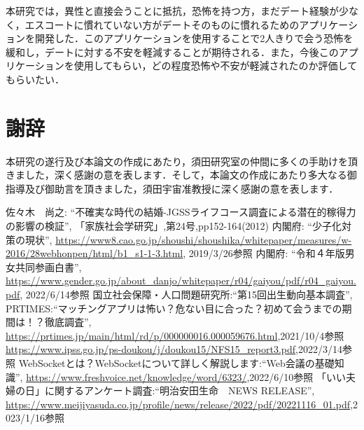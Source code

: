 \documentclass[12pt,a4j,titlepage]{ltjsarticle}
\begin{document}
本研究では，異性と直接会うことに抵抗，恐怖を持つ方，まだデート経験が少なく，エスコートに慣れていない方がデートそのものに慣れるためのアプリケーションを開発した．このアプリケーションを使用することで2人きりで会う恐怖を緩和し，デートに対する不安を軽減することが期待される．また，今後このアプリケーションを使用してもらい，どの程度恐怖や不安が軽減されたのか評価してもらいたい．

\clearpage



\section{謝辞}
本研究の遂行及び本論文の作成にあたり，須田研究室の仲間に多くの手助けを頂きました，深く感謝の意を表します．そして，本論文の作成にあたり多大なる御指導及び御助言を頂きました，須田宇宙准教授に深く感謝の意を表します．

\clearpage

\begin{thebibliography}{99}
 佐々木　尚之: ``不確実な時代の結婚-JGSSライフコース調査による潜在的稼得力の影響の検証'', 「家族社会学研究」,第24号,pp152-164(2012)
 内閣府: ``少子化対策の現状'', \url{https://www8.cao.go.jp/shoushi/shoushika/whitepaper/measures/w-2016/28webhonpen/html/b1_s1-1-3.html}, 2019/3/26参照
 内閣府: ``令和４年版男女共同参画白書'', \url{https://www.gender.go.jp/about_danjo/whitepaper/r04/gaiyou/pdf/r04_gaiyou.pdf}, 2022/6/14参照
国立社会保障・人口問題研究所:``第15回出生動向基本調査'',
PRTIMES:``マッチングアプリは怖い？危ない目に合った？初めて会うまでの期間は！？徹底調査'',
\url{https://prtimes.jp/main/html/rd/p/000000016.000059676.html},2021/10/4参照
\url{https://www.ipss.go.jp/ps-doukou/j/doukou15/NFS15_report3.pdf},2022/3/14参照
WebSocketとは？WebSocketについて詳しく解説します:``Web会議の基礎知識'',
\url{https://www.freshvoice.net/knowledge/word/6323/},2022/6/10参照
「いい夫婦の日」に関するアンケート調査:``明治安田生命　NEWS RELEASE'',
\url{https://www.meijiyasuda.co.jp/profile/news/release/2022/pdf/20221116_01.pdf},2023/1/16参照
\end{thebibliography}
\end{document}
